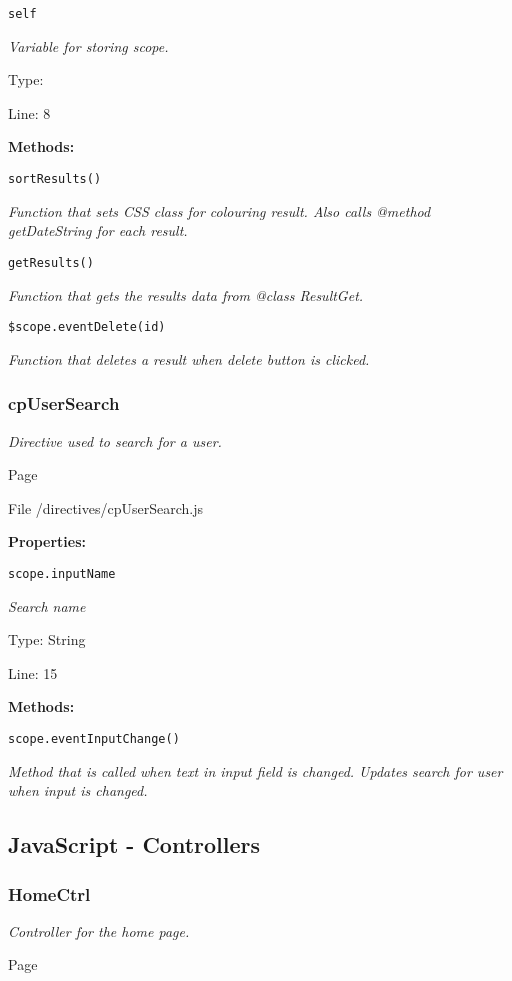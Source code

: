 \texttt{self}

{\scriptsize
\textit{Variable for storing scope.}

Type: 

Line: 8

}
\textbf{Methods:}

\texttt{sortResults()}

{\scriptsize
\textit{Function that sets CSS class for colouring result.
Also calls @method getDateString for each result.}

}

\texttt{getResults()}

{\scriptsize
\textit{Function that gets the results data from @class ResultGet.}

}

\texttt{\$scope.eventDelete(id)}

{\scriptsize
\textit{Function that deletes a result when delete button is clicked.}

}

\subsubsection{cpUserSearch}
\textit{Directive used to search for a user.}

Page \pageref{cpUserSearch.js}

File /directives/cpUserSearch.js

\textbf{Properties:}

\texttt{scope.inputName}

{\scriptsize
\textit{Search name}

Type: String

Line: 15

}
\textbf{Methods:}

\texttt{scope.eventInputChange()}

{\scriptsize
\textit{Method that is called when text in input field is changed.
Updates search for user when input is changed.}

}

\subsection{JavaScript - Controllers}
\subsubsection{HomeCtrl}
\textit{Controller for the home page.}

Page \pageref{HomeCtrl.js}

